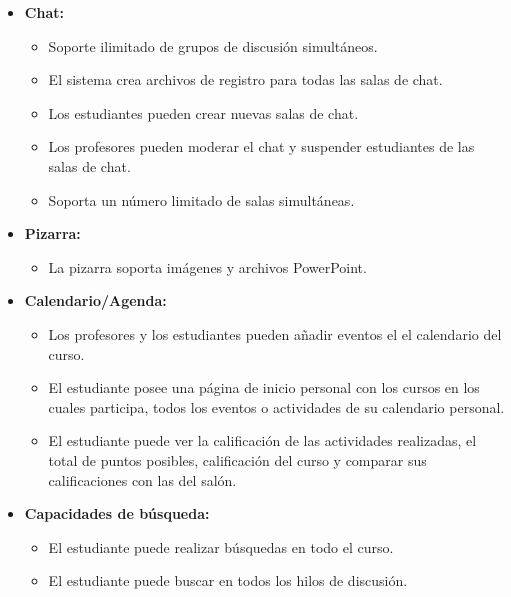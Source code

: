 	\begin{itemize}
		\item \textbf{Chat:}
			\begin{itemize}
				\item Soporte ilimitado de grupos de discusión simultáneos.
				\item El sistema crea archivos de registro para todas las salas de chat.
				\item Los estudiantes pueden crear nuevas salas de chat.
				\item Los profesores pueden moderar el chat y suspender estudiantes de las salas de chat.
				\item Soporta un número limitado de salas simultáneas.
			\end{itemize}
	\end{itemize}
	\begin{itemize}
		\item \textbf{Pizarra:}
			\begin{itemize}
				\item La pizarra soporta imágenes y archivos PowerPoint.
			\end{itemize}
	\end{itemize}
	\begin{itemize}
		\item \textbf{Calendario/Agenda:}
			\begin{itemize}
				\item Los profesores y los estudiantes pueden añadir eventos el el calendario del curso.
				\item El estudiante posee una página de inicio personal con los cursos en los cuales participa, todos los eventos o 		actividades de su calendario personal.
				\item El estudiante puede ver la calificación de las actividades realizadas, el total de puntos posibles, calificación del curso y comparar sus calificaciones con las del salón.
			\end{itemize}
	\end{itemize}
	\begin{itemize}
		\item \textbf{Capacidades de búsqueda:}
			\begin{itemize}
				\item El estudiante puede realizar búsquedas en todo el curso.
				\item El estudiante puede buscar en todos los hilos de discusión.
			\end{itemize}
	\end{itemize}

